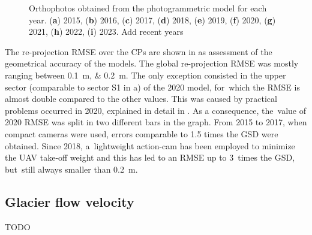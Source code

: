 \begin{figure}
{    }
    \caption{Orthophotos obtained from the photogrammetric model for each year.
        (\textbf{a}) 2015, (\textbf{b}) 2016, (\textbf{c}) 2017, (\textbf{d}) 2018,
        (\textbf{e})
        2019, (\textbf{f}) 2020, (\textbf{g}) 2021, (\textbf{h}) 2022, (\textbf{i})
        2023. {\color{red} Add recent years}}
    \label{fig:3:ortophoto}
\end{figure}

The re-projection RMSE over the CPs are shown in  as assessment
of the geometrical accuracy of the models.
The global re-projection RMSE was mostly ranging between \SIlist{0.1;0.2}{\meter}.
The only exception consisted in the {\color{red} upper sector (comparable to sector S1 in
a) of the 2020 model}, for~which the RMSE is almost double
compared to the other values.
{\color{red}
This was caused by practical problems occurred in 2020, explained in detail in
.
}
As a consequence, the~value of 2020 RMSE was split in two different bars in the graph.
From 2015 to 2017, when compact cameras were used, errors comparable to 1.5 times the GSD
were obtained.
Since 2018, a~lightweight action-cam has been employed to minimize the UAV take-off
weight and this has led to an RMSE up to 3~times the GSD, but~still always smaller than
\SI{0.2}{\meter}.

\subsection{Glacier flow velocity}\label{sec:3:res:velocity}
{\color{red} TODO}

